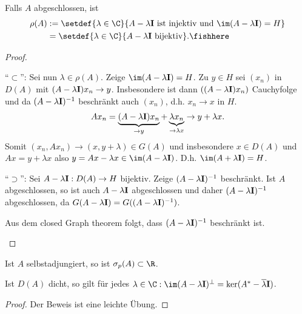 \begin{prop}
\label{prop:8.14}
Falls $A$ abgeschlossen, ist
\begin{align*}
\rho(A) &:= \setdef{\lambda\in\C}{A-\lambda\Id\text{ ist injektiv und
}\im(A-\lambda\Id)=H}\\
&= \setdef{\lambda\in\C}{A-\lambda\Id\text{ bijektiv}}.\fishhere
\end{align*}
\end{prop}
\begin{proof}
\begin{proofenum}
``$\subset$'': Sei nun $\lambda\in\rho(A)$. Zeige $\im(A-\lambda\Id)=H$. Zu
$y\in H$ sei $(x_n)$ in $D(A)$ mit $(A-\lambda\mathbf{I})x_n\to y$. Insbesondere ist dann
$((A-\lambda\mathbf{I})x_n)$ Cauchyfolge und da $(A-\lambda\mathbf{I})^{-1}$ beschränkt auch
$(x_n)$, d.h. $x_n\to x$ in $H$.
\begin{align*}
Ax_n = \underbrace{(A-\lambda\mathbf{I})x_n}_{\to y} + \underbrace{\lambda x_n}_{\to
\lambda x} \to y +\lambda x.
\end{align*}
Somit $(x_n,Ax_n)\to (x,y+\lambda)\in G(A)$ und insbesondere $x\in D(A)$ und
$Ax = y+\lambda x$ also $y= Ax-\lambda x\in \im (A-\lambda\Id)$. D.h.
$\im(A+\lambda\Id)=H$.

``$\supset$'': Sei $A-\lambda\mathbf{I}: D(A)\to H$ bijektiv. Zeige
$(A-\lambda\mathbf{I})^{-1}$ beschränkt. Ist $A$ abgeschlossen, so ist auch
$A-\lambda\mathbf{I}$ abgeschlossen und daher $(A-\lambda\mathbf{I})^{-1}$ abgeschlossen, da
$G(A-\lambda\mathbf{I})=G((A-\lambda\mathbf{I})^{-1})$.

Aus dem closed Graph theorem folgt, dass $(A-\lambda\mathbf{I})^{-1}$ beschränkt
ist.\qedhere
\end{proofenum}
\end{proof}

\begin{lem}
\label{prop:8.15}
\begin{propenum}
\item Ist $A$ selbstadjungiert, so ist $\sigma_p(A)\subset\R$.
\item Ist $D(A)$ dicht, so gilt für jedes $\lambda\in\C:\im(A-\lambda\Id)^\bot = \ker(A^*-\overline{\lambda}\Id)$.\fishhere
\end{propenum}
\end{lem}
\begin{proof}
Der Beweis ist eine leichte Übung.\qedhere
\end{proof}

